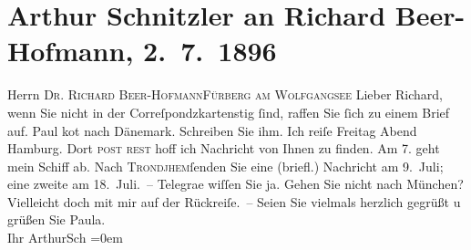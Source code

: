 

         
         \renewcommand{\erwaehntePersonen}{Personen: Richard Beer-Hofmann, Paula Beer-Hofmann, Paul Goldmann}
         \renewcommand{\erwaehnteOrte}{Orte: Dänemark, Fürberg, Hamburg, München, St. Gilgen, Trondheim, VI., Mariahilf, Wien}
         \renewcommand{\erwaehnteWerke}{}
               \section[Arthur Schnitzler an Richard Beer-Hofmann, 2. 7. 1896]{ Arthur Schnitzler an Richard Beer-Hofmann, 2. 7. 1896}\nopagebreak{}\rehead{ }\begin{ledgroupsized}[t]{13cm}\normalsize\beginnumbering \toendnotes[C]{\smallbreak\pagebreak[2]} 
\pstart{}{\pb}Herrn \textsc{Dr. Richard
                     Beer-Hofmann}\pend{}\pstart{}\textsc{Fürberg am Wolfgangsee}\pend{}{\bigskip}\pstart
           \noindent{}{\pb}Lieber Richard, wenn Sie nicht in der Correſpondzkartensti{\geminationm}g ſind, raffen Sie ſich zu einem Brief auf. Paul ko{\geminationm}t nach Dänemark. Schreiben Sie ihm. Ich reiſe
                  Freitag Abend Hamburg. Dort \textsc{post rest} hoff ich Nachricht von Ihnen zu finden. Am
                  7. geht mein Schiff ab. Nach \textsc{Trondjhem}ſenden Sie eine \introOben{}(briefl.)\introOben{}
               Nachricht am 9. Juli; eine zweite am 18. Juli. – Telegra{\geminationm}e wiſſen Sie ja. Gehen Sie nicht nach München? Vielleicht doch mit mir auf der
               Rückreiſe. –\pend
           \pstart
           Seien Sie vielmals herzlich gegrüßt u grüßen Sie Paula.{\\[\baselineskip]}Ihr \spacefill\mbox{ArthurSch}\pend
           \leftskip=0em{}
         
         \endnumbering{}\end{ledgroupsized}  \newcommand{\dateiname}{L00559}\newcommand{\titel}{Arthur Schnitzler an Richard Beer-Hofmann, 2. 7. 1896}\newcommand{\editorInnen}{Martin Anton Müller und Gerd-Hermann Susen}
      